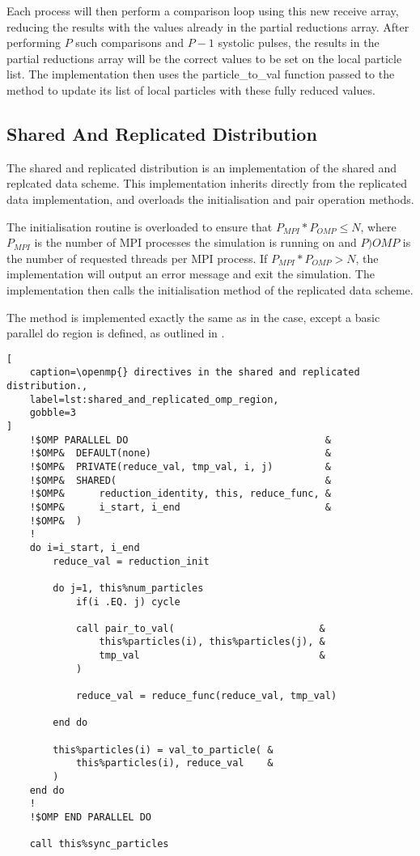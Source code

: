 Each process will then perform a comparison loop using this new receive
array, reducing the results with the values already in the partial
reductions array.
%
After performing $P$ such comparisons and $P-1$ systolic pulses,
the results in the partial reductions array will be the correct
values to be set on the local particle list.
%
The implementation then uses the particle\_to\_val function
passed to the method to update
its list of local particles with these fully reduced values.


\subsection{Shared And Replicated Distribution}

%
The shared and replicated distribution is an implementation of the
shared and replcated data scheme.
%
This implementation inherits directly from the replicated data
implementation, and overloads the initialisation and pair operation
methods.

The initialisation routine is overloaded to ensure that
$P_{MPI}*P_{OMP} \le{} N$, where $P_{MPI}$ is the number of MPI
processes the simulation is running on and $P){OMP}$ is the
number of requested \openmp{} threads per MPI process.
%
If $P_{MPI}*P_{OMP} > N$, the implementation will output an error message
and exit the simulation.
%
The implementation then calls the initialisation method of the
replicated data scheme.

The \pairoperation{} method is implemented exactly the same
as in the \replicateddata{} case, except a basic \openmp{}
parallel do region is defined, as outlined in
.

\begin{lstlisting}[
    caption=\openmp{} directives in the shared and replicated distribution.,
    label=lst:shared_and_replicated_omp_region,
    gobble=3
]
    !$OMP PARALLEL DO                                  &
    !$OMP&  DEFAULT(none)                              &
    !$OMP&  PRIVATE(reduce_val, tmp_val, i, j)         &
    !$OMP&  SHARED(                                    &
    !$OMP&      reduction_identity, this, reduce_func, &
    !$OMP&      i_start, i_end                         &
    !$OMP&  )
    !
    do i=i_start, i_end
        reduce_val = reduction_init

        do j=1, this%num_particles
            if(i .EQ. j) cycle

            call pair_to_val(                         &
                this%particles(i), this%particles(j), &
                tmp_val                               &
            )

            reduce_val = reduce_func(reduce_val, tmp_val)

        end do

        this%particles(i) = val_to_particle( &
            this%particles(i), reduce_val    &
        )
    end do
    !
    !$OMP END PARALLEL DO

    call this%sync_particles
\end{lstlisting}


